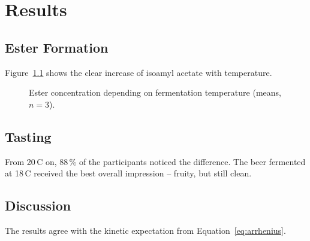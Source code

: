 \chapter{Results}
\label{cha:evaluation}

\section{Ester Formation}
Figure~\ref{fig:esters} shows the clear increase of isoamyl acetate with temperature.

\begin{figure}[htbp]
  \centering
  \caption{Ester concentration depending on fermentation temperature (means, $n=3$).}
  \label{fig:esters}
\end{figure}

\section{Tasting}
From 20\,\textdegree{}C on, 88\,\% of the participants noticed the difference. The beer
fermented at 18\,\textdegree{}C received the best overall impression -- fruity, but still clean.

\section{Discussion}
The results agree with the kinetic expectation from Equation~\ref{eq:arrhenius}.
